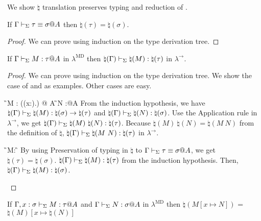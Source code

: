 We show \( \natural \) translation preserves typing and reduction of \LMD.

\begin{lemma}
    If $\Gamma \vdash_\Sigma \tau \equiv \sigma @ A$ then $\natural(\tau) = \natural(\sigma)$.
\end{lemma}

\begin{proof}
    We can prove using induction on the type derivation tree.
\end{proof}

\begin{lemma}
    \label{lemma:PreservationOfTypingInNatural}
    If $\G \V M:\tau@A$ in $\lambda^{\text{MD}}$ then $\natural(\Gamma) \vdash_\Sigma \natural(M): \natural(\tau)$ in $\lambda^\to$.
\end{lemma}

\begin{proof}
    We can prove using induction on the type derivation tree.
    We show the case of \TApp{} and \TConv{} as examples.
    Other cases are easy.
    \begin{rneqncase}{\TApp{}}{
            \G \V M : (\Pi(x:\sigma).\tau) @ A  \G \V N :\sigma @A
        }
        From the induction hypothesis, we have $\natural(\Gamma) \vdash_\Sigma \natural(M) : \natural(\sigma) \to \natural(\tau)$ and $\natural(\Gamma) \vdash_\Sigma \natural(N) : \natural(\sigma)$.
        Use the Application rule in $\lambda^\to$, we get $\natural(\G) \V \natural(M)\ \natural(N) : \natural(\tau)$.
        Because $\natural(M)\ \natural(N) = \natural(M\ N)$ from the definition of $\natural$, $\natural(\Gamma) \vdash_\Sigma \natural(M\ N) : \natural(\tau)$ in $\lambda^\to$.
    \end{rneqncase}
    \begin{rneqncase}{\TConv{}}{
            \G\V M:\tau@A {} \G\V \tau\E\sigma@A
        }
        By using Preservation of typing in $\natural$ to $\G\V \tau\E\sigma@A$, we get $\natural(\tau) = \natural(\sigma)$.
        $\natural(\Gamma) \vdash_\Sigma \natural(M):\natural(\tau)$ from the induction hypothesis.
        Then, $\natural(\Gamma) \vdash_\Sigma \natural(M):\natural(\sigma)$.
    \end{rneqncase}
\end{proof}

\begin{lemma}
    If $\G, x:\sigma \V M:\tau@A$ and $\G \V N:\sigma@A$ in $\lambda^{\text{MD}}$
    then $\natural(M[x \mapsto N])$ = $\natural(M)[x\mapsto\natural(N)]$
\end{lemma}

